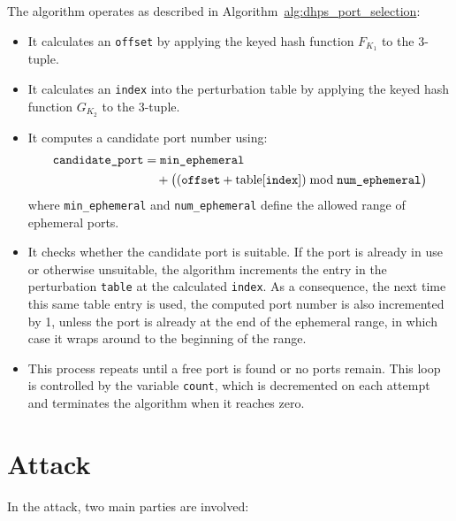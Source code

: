 \documentclass[twocolumn]{report}
\begin{document}
The algorithm operates as described in Algorithm~\hyperref[1]{alg:dhps_port_selection}:
\begin{itemize}
	\item It calculates an \texttt{offset} by applying the keyed hash function \( F_{K_1} \) to the 3-tuple.
	\item It calculates an \texttt{index} into the perturbation table by applying the keyed hash function \( G_{K_2} \) to the 3-tuple.
	\item It computes a candidate port number using:
	\begin{equation*}
		\begin{split}
			\texttt{candidate\_port}
			 & = \texttt{min\_ephemeral}      \\
			 & \quad + \bigl((\texttt{offset}
			+ \text{table[{\texttt{index}}]})
			\bmod \texttt{num\_ephemeral}\bigr)
		\end{split}
	\end{equation*}
	where \texttt{min\_ephemeral} and \texttt{num\_ephemeral} define the allowed range of ephemeral ports.
	\item It checks whether the candidate port is suitable. If the port is already in use or otherwise unsuitable, the algorithm increments the entry in the perturbation \texttt{table} at the calculated \texttt{index}. As a consequence, the next time this same table entry is used, the computed port number is also \alert{incremented by 1}, unless the port is already at the end of the ephemeral range, in which case it wraps around to the beginning of the range.
	\item This process \alert{repeats until} a free port is found or no ports remain. This loop is controlled by the variable \texttt{count}, which is decremented on each attempt and terminates the algorithm when it reaches zero.
\end{itemize}

\vspace{0.2cm}


\section{Attack}
\label{sec:attack}

In the attack, two main parties are involved:
\end{document}
